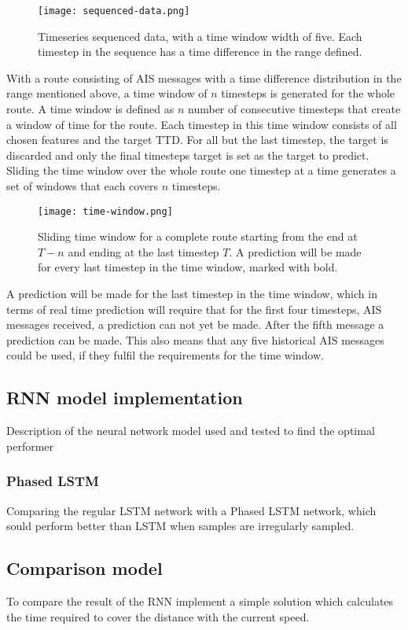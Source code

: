 \documentclass[../main.tex]{subfiles}
\begin{document}
\begin{figure}[H]
	\centering
	\texttt{[image: sequenced-data.png]}
	\caption{Timeseries sequenced data, with a time window width of five. Each timestep in the sequence has a time difference in the range defined.}
	\label{fig:seq-data}
\end{figure}

With a route consisting of AIS messages with a time difference distribution in the range mentioned above, a time window of $n$ timesteps is generated for the whole route. A time window is defined as $n$ number of consecutive timesteps that create a window of time for the route. Each timestep in this time window consists of all chosen features and the target TTD. For all but the last timestep, the target is discarded and only the final timesteps target is set as the target to predict. Sliding the time window over the whole route one timestep at a time generates a set of windows that each covers $n$ timesteps. 

\begin{figure}[H]
	\centering
	\texttt{[image: time-window.png]}
	\caption{Sliding time window for a complete route starting from the end at $T-n$ and ending at the last timestep $T$. A prediction will be made for every last timestep in the time window, marked with bold.}
	\label{fig:time-window}
\end{figure}

A prediction will be made for the last timestep in the time window, which in terms of real time prediction will require that for the first four timesteps, AIS messages received, a prediction can not yet be made. After the fifth message a prediction can be made. This also means that any five historical AIS messages could be used, if they fulfil the requirements for the time window.


\subsection{RNN model implementation}

Description of the neural network model used and tested to find the optimal performer

\subsubsection{Phased LSTM}

Comparing the regular LSTM network with a Phased LSTM network, which sould perform better than LSTM when samples are irregularly sampled.

\subsection{Comparison model}

To compare the result of the RNN implement a simple solution which calculates the time required to cover the distance with the current speed.
\end{document}

